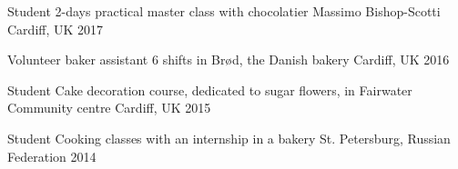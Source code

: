 


\begin{cvhonors}

  \cvhonor
    {Student} %
    {2-days practical master class with chocolatier Massimo Bishop-Scotti} %
    {Cardiff, UK} %
    {2017}

  \cvhonor
    {Volunteer baker assistant} %
    {6 shifts in Brød, the Danish bakery} %
    {Cardiff, UK} %
    {2016} %

  \cvhonor
    {Student} %
    {Cake decoration course, dedicated to sugar flowers, in Fairwater Community centre} %
    {Cardiff, UK} %
    {2015} %

  \cvhonor
    {Student} %
    {Cooking classes with an internship in a bakery} %
    {St. Petersburg, Russian Federation} %
    {2014} %

\end{cvhonors}
